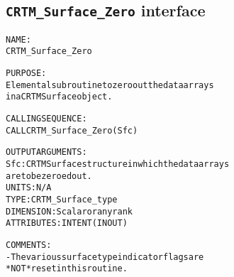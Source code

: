 \subsection{\texttt{CRTM\_Surface\_Zero} interface}
  \label{sec:CRTM_Surface_Zero_interface}
  \begin{alltt}
 
  NAME:
        CRTM_Surface_Zero
 
  PURPOSE:
        Elemental subroutine to zero out the data arrays
        in a CRTM Surface object.
 
  CALLING SEQUENCE:
        CALL CRTM_Surface_Zero( Sfc )
 
  OUTPUT ARGUMENTS:
        Sfc:          CRTM Surface structure in which the data arrays
                      are to be zeroed out.
                      UNITS:      N/A
                      TYPE:       CRTM_Surface_type
                      DIMENSION:  Scalar or any rank
                      ATTRIBUTES: INTENT(IN OUT)
 
  COMMENTS:
        - The various surface type indicator flags are
          *NOT* reset in this routine.
 
  \end{alltt}
